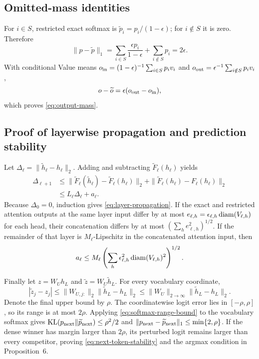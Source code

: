 \subsection{Omitted-mass identities}

For $i\in S$, restricted exact softmax is
$\widetilde p_i=p_i/(1-\epsilon)$; for $i\notin S$ it is zero.
Therefore
\begin{equation}
 \|p-\widetilde p\|_1
 =\sum_{i\in S}\frac{\epsilon p_i}{1-\epsilon}
 +\sum_{i\notin S}p_i
 =2\epsilon.
\end{equation}
With conditional Value means
$o_{\rm in}=(1-\epsilon)^{-1}\sum_{i\in S}p_iv_i$ and
$o_{\rm out}=\epsilon^{-1}\sum_{i\notin S}p_iv_i$,
\begin{equation}
 o-\widetilde o
 =\epsilon(o_{\rm out}-o_{\rm in}),
\end{equation}
which proves \cref{eq:output-mass}.

\subsection{Proof of layerwise propagation and prediction stability}

Let $\Delta_\ell=\|\widetilde h_\ell-h_\ell\|_2$.
Adding and subtracting $\widetilde F_\ell(h_\ell)$ yields
\begin{align}
 \Delta_{\ell+1}
 &\le
 \|\widetilde F_\ell(\widetilde h_\ell)
       -\widetilde F_\ell(h_\ell)\|_2
 +\|\widetilde F_\ell(h_\ell)-F_\ell(h_\ell)\|_2\\
 &\le L_\ell\Delta_\ell+a_\ell.
\end{align}
Because $\Delta_0=0$, induction gives
\cref{eq:layer-propagation}.
If the exact and restricted attention outputs at the same layer input differ
by at most
$e_{\ell,h}=\epsilon_{\ell,h}\operatorname{diam}(V_{\ell,h})$ for each head, their
concatenation differs by at most
$(\sum_he_{\ell,h}^2)^{1/2}$.
If the remainder of that layer is $M_\ell$-Lipschitz in the concatenated
attention input, then
\begin{equation}
 a_\ell\le
 M_\ell\left(\sum_h
 \epsilon_{\ell,h}^2\operatorname{diam}(V_{\ell,h})^2\right)^{1/2}.
\end{equation}

Finally let $z=W_Uh_L$ and $\widetilde z=W_U\widetilde h_L$.
For every vocabulary coordinate,
\begin{equation}
 |\widetilde z_j-z_j|
 \le\|W_{U,j:}\|_2\|\widetilde h_L-h_L\|_2
\le\|W_U\|_{2\rightarrow\infty}\|\widetilde h_L-h_L\|_2.
\end{equation}
Denote the final upper bound by $\rho$.  The coordinatewise logit error lies
in $[-\rho,\rho]$, so its range is at most $2\rho$.
Applying \cref{eq:softmax-range-bound} to the vocabulary softmax gives
$\mathrm{KL}(p_{\rm next}\|\widetilde p_{\rm next})\le\rho^2/2$ and
$\|p_{\rm next}-\widetilde p_{\rm next}\|_1\le\min\{2,\rho\}$.
If the dense winner has margin larger than $2\rho$, its perturbed logit
remains larger than every competitor, proving
\cref{eq:next-token-stability} and the argmax condition in Proposition~6.

